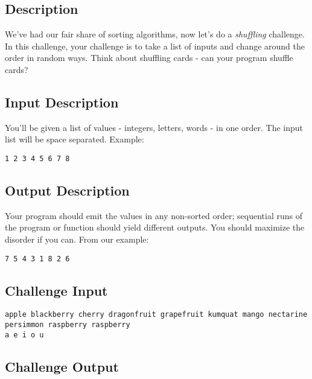 \subsection*{Description}\label{description-8}

We've had our fair share of sorting algorithms, now let's do a
\emph{shuffling} challenge. In this challenge, your challenge is to take
a list of inputs and change around the order in random ways. Think about
shuffling cards - can your program shuffle cards?

\subsection*{Input Description}\label{input-description-7}

You'll be given a list of values - integers, letters, words - in one
order. The input list will be space separated. Example:

\begin{lstlisting}
1 2 3 4 5 6 7 8 
\end{lstlisting}

\subsection*{Output Description}\label{output-description-7}

Your program should emit the values in any non-sorted order; sequential
runs of the program or function should yield different outputs. You
should maximize the disorder if you can. From our example:

\begin{lstlisting}
7 5 4 3 1 8 2 6
\end{lstlisting}

\subsection*{Challenge Input}\label{challenge-input-6}

\begin{lstlisting}
apple blackberry cherry dragonfruit grapefruit kumquat mango nectarine persimmon raspberry raspberry
a e i o u
\end{lstlisting}

\subsection*{Challenge Output}\label{challenge-output-5}

